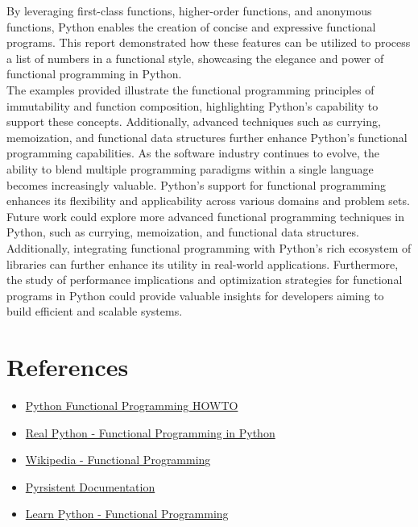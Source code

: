 \documentclass[a4paper]{article}
\begin{document}
By leveraging first-class functions, higher-order functions, and anonymous functions, Python enables the creation of concise and expressive functional programs. This report demonstrated how these features can be utilized to process a list of numbers in a functional style, showcasing the elegance and power of functional programming in Python.\\

The examples provided illustrate the functional programming principles of immutability and function composition, highlighting Python's capability to support these concepts. Additionally, advanced techniques such as currying, memoization, and functional data structures further enhance Python's functional programming capabilities. As the software industry continues to evolve, the ability to blend multiple programming paradigms within a single language becomes increasingly valuable. Python's support for functional programming enhances its flexibility and applicability across various domains and problem sets.\\

Future work could explore more advanced functional programming techniques in Python, such as currying, memoization, and functional data structures. Additionally, integrating functional programming with Python's rich ecosystem of libraries can further enhance its utility in real-world applications. Furthermore, the study of performance implications and optimization strategies for functional programs in Python could provide valuable insights for developers aiming to build efficient and scalable systems.\\


\newpage
\section{References}
\begin{itemize}
    \item \href{https://docs.python.org/3/howto/functional.html}{Python Functional Programming HOWTO}
    \item \href{https://realpython.com/python-functional-programming/}{Real Python - Functional Programming in Python}
    \item \href{https://en.wikipedia.org/wiki/Functional_programming}{Wikipedia - Functional Programming}
    \item \href{https://pypi.org/project/pyrsistent/}{Pyrsistent Documentation}
    \item \href{https://www.learnpython.org/en/Functional_Programming}{Learn Python - Functional Programming}
\end{itemize}
\end{document}
